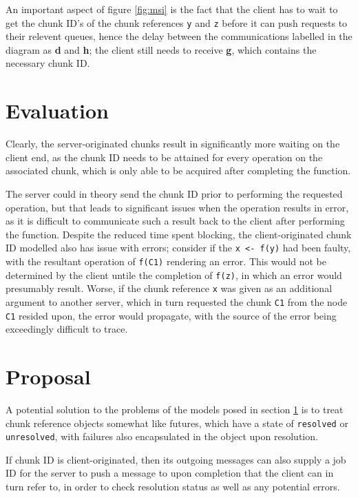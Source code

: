 \documentclass[a4paper,10pt]{article}
\begin{document}
An important aspect of figure \ref{fig:msi} is the fact that the client has to
wait to get the chunk ID's of the chunk references \texttt{y} and \texttt{z}
before it can push requests to their relevent queues, hence the delay between
the communications labelled in the diagram as \textcolor{dark2-3}{\textbf{d}}
and \textcolor{dark2-3}{\textbf{h}}; the client still needs to receive
\textcolor{dark2-1}{\textbf{g}}, which contains the necessary chunk ID.

\section{Evaluation}\label{sec:mod-eval}

Clearly, the server-originated chunks result in significantly more waiting on
the client end, as the chunk ID needs to be attained for every operation on the
associated chunk, which is only able to be acquired after completing the
function.

The server could in theory send the chunk ID prior to performing the requested
operation, but that leads to significant issues when the operation results in
error, as it is difficult to communicate such a result back to the client after
performing the function.
Despite the reduced time spent blocking, the client-originated chunk ID
modelled also has issue with errors; consider if the \texttt{x <- f(y)} had
been faulty, with the resultant operation of \texttt{f(C1)} rendering an error.
This would not be determined by the client untile the completion of
\texttt{f(z)}, in which an error would presumably result.
Worse, if the chunk reference \texttt{x} was given as an additional argument to
another server, which in turn requested the chunk \texttt{C1} from the node
\texttt{C1} resided upon, the error would propagate, with the source of the
error being exceedingly difficult to trace.

\section{Proposal}

A potential solution to the problems of the models posed in section
\ref{sec:mod-eval} is to treat chunk reference objects somewhat like futures,
which have a state of \texttt{resolved} or \texttt{unresolved}, with failures
also encapsulated in the object upon resolution\cite{bengtsson19:_futur_r}.

If chunk ID is client-originated, then its outgoing messages can also supply a
job ID for the server to push a message to upon completion that the client can
in turn refer to, in order to check resolution status as well as any potential
errors.
\end{document}
